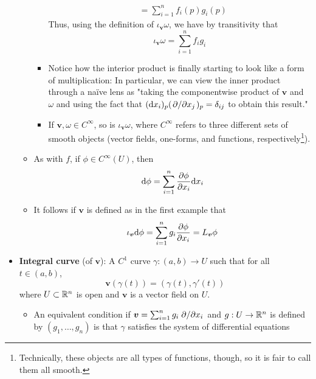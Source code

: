 \documentclass[../notes.tex]{subfiles}
\begin{document}
\begin{itemize}
\begin{itemize}
\begin{itemize}
\begin{align*}
                &= \sum_{i=1}^nf_i(p)g_i(p)
            \end{align*}
            Thus, using the definition of $\iota_{\bm{v}}\omega$, we have by transitivity that
            \begin{equation*}
                \iota_{\bm{v}}\omega = \sum_{i=1}^nf_ig_i
            \end{equation*}
            \item Notice how the interior product is finally starting to look like a form of multiplication: In particular, we can view the inner product through a na\"{i}ve lens as "taking the componentwise product of $\bm{v}$ and $\omega$ and using the fact that $(\dd x_i)_p(\pdv*{x_j})_p=\delta_{ij}$ to obtain this result."
            \item If $\bm{v},\omega\in C^\infty$, so is $\iota_{\bm{v}}\omega$, where $C^\infty$ refers to three different sets of smooth objects (vector fields, one-forms, and functions, respectively\footnote{Technically, these objects are all types of functions, though, so it is fair to call them all smooth.}).
        \end{itemize}
        \item As with $f$, if $\phi\in C^\infty(U)$, then
        \begin{equation*}
            \dd\phi = \sum_{i=1}^n\pdv{\phi}{x_i}\dd x_i
        \end{equation*}
        \item It follows if $\bm{v}$ is defined as in the first example that
        \begin{equation*}
            \iota_{\bm{v}}\dd\phi = \sum_{i=1}^ng_i\pdv{\phi}{x_i}
            = L_{\bm{v}}\phi
        \end{equation*}
    \end{itemize}
    \item \textbf{Integral curve} (of $\bm{v}$): A $C^1$ curve $\gamma:(a,b)\to U$ such that for all $t\in(a,b)$,
    \begin{equation*}
        \bm{v}(\gamma(t)) = (\gamma(t),\gamma'(t))
    \end{equation*}
    where $U\subset\mathbb{R}^n$ is open and $\bm{v}$ is a vector field on $U$.
    \begin{itemize}
        \item An equivalent condition if $\bm{v}=\sum_{i=1}^ng_i\pdv*{x_i}$ and $g:U\to\mathbb{R}^n$ is defined by $(g_1,\dots,g_n)$ is that $\gamma$ satisfies the system of differential equations
        \begin{equation*}

\end{equation*}
\end{itemize}
\end{itemize}
\end{document}
